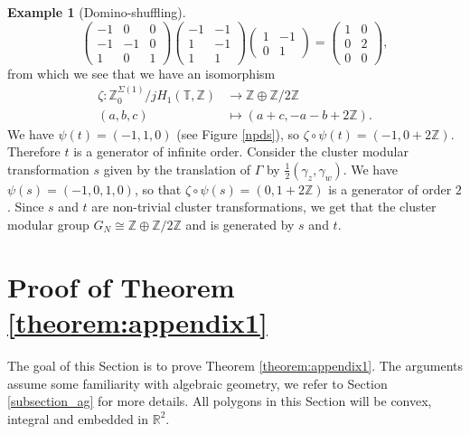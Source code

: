 \documentclass[11pt]{article} %
\theoremstyle{definition}
\newtheorem{example}[theorem]{Example}
\newcommand{\Z}{{\mathbb Z}}
\newcommand{\T}{{\mathbb T}}
\newcommand{\ra}{\rightarrow}
\begin{document}
\begin{example}[Domino-shuffling]
\[
\begin{pmatrix}
-1&0&0\\
-1&-1&0\\
1&0&1
\end{pmatrix}
\begin{pmatrix}
-1&-1\\
1&-1\\
1&1
\end{pmatrix}\begin{pmatrix}
1&-1\\
0&1
\end{pmatrix}= \begin{pmatrix}
1&0\\
0&2\\
0&0
\end{pmatrix},
\]
from which we see that we have an isomorphism \begin{align*}
  \zeta: \Z^{\Sigma(1)}_0/jH_1(\T,\Z) &\ra \Z \oplus \Z/2\Z\\
  (a,b,c) &\mapsto (a+c,-a-b + 2 \Z).
\end{align*} 
 We have $\psi(t)=(-1,1,0)$ (see Figure \ref{npds}), so $\zeta \circ \psi(t)= (-1,0+2\Z)$. Therefore $t$ is a generator of infinite order. Consider the cluster modular transformation $s$ given by the translation of $\Gamma$ by $\frac 1 2 (\gamma_z,\gamma_w)$. We have $\psi(s)=(-1,0,1,0)$, so that $\zeta \circ \psi(s)=(0,1+2 \Z)$ is a generator of order $2$. Since $s$ and $t$ are non-trivial cluster transformations, we get that the cluster modular group $G_N \cong \Z \oplus \Z/2\Z$ and is generated by $s$ and $t$.
\end{example} 
 
\section{Proof of Theorem \ref{theorem:appendix1}}\label{sec:appendix}
The goal of this Section is to prove Theorem \ref{theorem:appendix1}. The arguments assume some familiarity with algebraic geometry, we refer to Section \ref{subsection_ag} for more details. All polygons in this Section will be convex, integral and embedded in $\mathbb{R}^2$.

\end{document}
